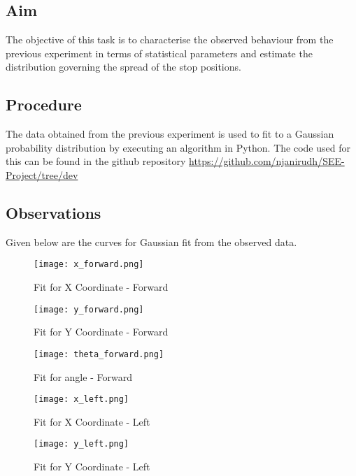\documentclass[10pt,a4paper]{article}
\begin{document}
\subsection{Aim}
\Large
The objective of this task is to characterise the observed behaviour from the previous experiment in terms of statistical parameters and estimate the distribution governing the spread of the stop positions.


\subsection{Procedure}


The data obtained from the previous experiment is used to fit to a Gaussian probability distribution by executing an algorithm in Python. The code used for this can be found in the github repository \href{https://github.com/njanirudh/SEE-Project/tree/dev}{https://github.com/njanirudh/SEE-Project/tree/dev}


\subsection{Observations}
		
Given below are the curves for Gaussian fit from the observed data.

\begin{figure}[H]
	\centering
	\texttt{[image: x\_forward.png]}
	\caption{Fit for X Coordinate - Forward}
\end{figure}

\begin{figure}[H]
	\centering
	\texttt{[image: y\_forward.png]}
	\caption{Fit for Y Coordinate - Forward}
\end{figure}	

\begin{figure}[H]
	\centering
	\texttt{[image: theta\_forward.png]}
	\caption{Fit for angle - Forward}
\end{figure}

\begin{figure}[H]
	\centering
	\texttt{[image: x\_left.png]}
	\caption{Fit for X Coordinate - Left}
\end{figure}

\begin{figure}[H]
	\centering
	\texttt{[image: y\_left.png]}
	\caption{Fit for Y Coordinate - Left}
\end{figure}	
\end{document}
